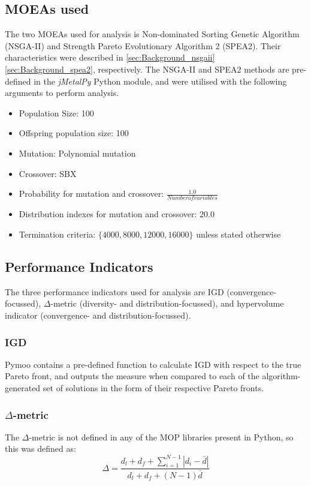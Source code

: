 \documentclass[sigconf,nonacm]{acmart}
\begin{document}
\subsection{MOEAs used}
The two MOEAs used for analysis is Non-dominated Sorting Genetic Algorithm (NSGA-II) and Strength Pareto Evolutionary Algorithm 2 (SPEA2). Their characteristics were described in \autoref{sec:Background_nsgaii} \autoref{sec:Background_spea2}, respectively. The NSGA-II and SPEA2 methods are pre-defined in the \textit{jMetalPy} Python module, and were utilised with the following arguments to perform analysis.
\begin{itemize}
    \item Population Size: 100
    \item Offspring population size: 100
    \item Mutation: Polynomial mutation
    \item Crossover: SBX
    \item Probability for mutation and crossover: $\frac{1.0}{Number of variables}$
    \item Distribution indexes for mutation and crossover: $20.0$
    \item Termination criteria: $\{4000, 8000, 12000, 16000\}$ unless stated otherwise
\end{itemize}

\subsection{Performance Indicators}
The three performance indicators used for analysis are IGD (convergence-focussed), $\Delta$-metric (diversity- and distribution-focussed), and hypervolume indicator (convergence- and distribution-focussed).
\subsubsection{IGD}
Pymoo contains a pre-defined function to calculate IGD with respect to the true Pareto front, and outputs the measure when compared to each of the algorithm-generated set of solutions in the form of their respective Pareto fronts.
\subsubsection{$\Delta$-metric}
The $\Delta$-metric is not defined in any of the MOP libraries present in Python, so this was defined as\cite{cai2018,yan2007}:
\begin{equation}
    \Delta = \frac{d_{l} + d_{f} + \sum_{i=1}^{N-1} |d_{i}-\bar{d}|}{d_{l} + d_{f} + (N-1)\bar{d}}
\end{equation}
\end{document}
